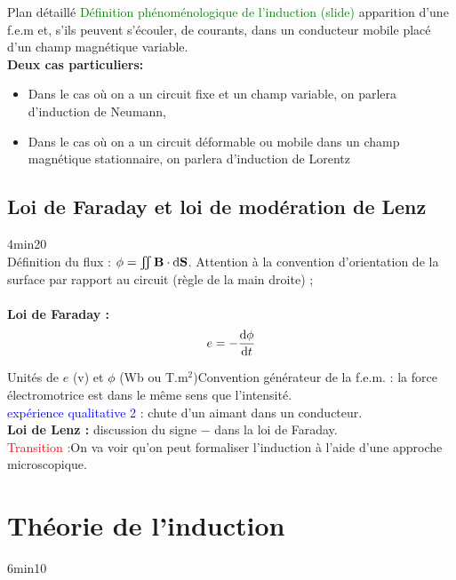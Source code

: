 \begin{reportBlock}{Plan détaillé}
  \textcolor{green}{Définition phénoménologique de l'induction (slide)} apparition d'une f.e.m et, s'ils peuvent s'écouler, de courants, dans un conducteur mobile placé d'un champ magnétique variable.\\
  
  \textbf{Deux cas particuliers:} \begin{itemize}
      \item Dans le cas où on a un circuit fixe et un champ variable, on parlera d'induction de Neumann,
      \item Dans le cas où on a un circuit déformable ou mobile dans un champ magnétique stationnaire, on parlera d'induction de Lorentz
  \end{itemize}
  
  \subsection{Loi de Faraday et loi de modération de Lenz}
  4min20\\
  Définition du flux : $\phi = \iint \mathbf B \cdot \mathrm{d} \mathbf S$. Attention à la convention d'orientation de la surface par rapport au circuit (règle de la main droite) ; \\ \\
  \textbf{Loi de Faraday :}
  \begin{equation}
    e = - \frac{\mathrm{d} \phi}{\mathrm{d} t}
  \end{equation}

Unités de $e$ (v) et $\phi$ (Wb ou T.m$^2$)Convention générateur de la f.e.m. : la force électromotrice est dans le même sens que l'intensité.\\

\textcolor{blue}{expérience qualitative 2 :} chute d'un aimant dans un conducteur.\\
\textbf{Loi de Lenz :} discussion du signe $-$ dans la loi de Faraday.\\

\textcolor{red}{Transition :}On va voir qu'on peut formaliser l'induction à l'aide d'une approche microscopique. 

\section{Théorie de l'induction} 6min10

\end{reportBlock}
